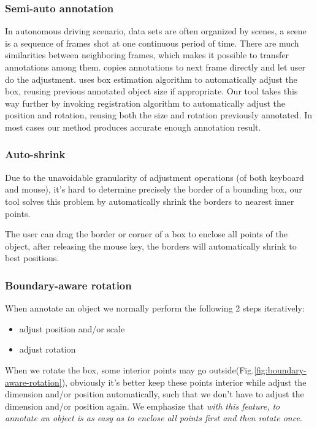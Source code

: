 \documentclass[letterpaper, 10 pt, conference]{ieeeconf}  %
\begin{document}
\subsubsection{Semi-auto annotation}
\label{semi-auto-anno}
In autonomous driving scenario, data sets are often organized by scenes\cite{Caesar2019nuScenesAM,Patil2019TheHD,lyft2019}, a scene is a sequence of frames shot at one continuous period of time. There are much similarities between neighboring frames, which makes it possible to transfer annotations among them. \cite{Zimmer20193DBA} copies annotations to next frame directly and let user do the adjustment.\cite{Wang2019LATTEAL} uses box estimation algorithm to automatically adjust the box, reusing previous annotated object size if appropriate. Our tool takes this way further by invoking registration algorithm \cite{Yang2016GoICPAG} to automatically adjust the position and rotation, reusing both the size and rotation previously annotated. In most cases our method produces  accurate enough annotation result.


\subsubsection{Auto-shrink}

Due to the unavoidable granularity of adjustment operations (of both keyboard and mouse), it's hard to determine precisely the border of a bounding box, our tool solves this problem by automatically shrink the borders to nearest inner points.

The user can drag the border or corner of a box to enclose all points of the object, after releasing the mouse key, the borders will automatically shrink to best positions.

\subsubsection{Boundary-aware rotation}

When annotate an object we normally perform the following 2 steps iteratively:
\begin{itemize}
	\item adjust position and/or scale
	\item adjust rotation	
\end{itemize}

When we rotate the box, some interior points may go outside(Fig.\ref{fig:boundary-aware-rotation}), obviously it's better keep these points interior while adjust the dimension and/or position automatically, such that we don't have to adjust the dimension and/or position again. We emphasize that \emph{with this feature, to annotate an object is as easy as to enclose all points first and then rotate once}.
\end{document}
